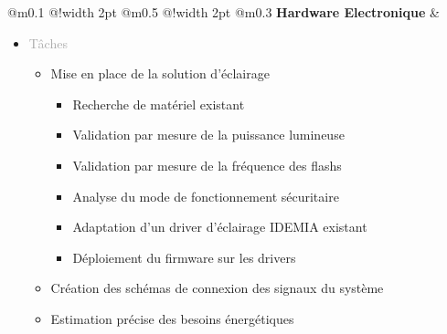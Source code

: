 \documentclass{article}
\begin{document}
\begin{tabular}
    {
        @{}m{}
        @{\hspace{0.001\textwidth}}!{\color{secondaryBlue}\vline width 2pt}
        @{}m{0.5\textwidth}
        @{\hspace{0.025\textwidth}}!{\color{secondaryBlue}\vline width 2pt}
        @{}m{0.3\textwidth}
    }
    \textcolor{secondaryBlue}{\textbf{Hardware Electronique}}           
    &
    \begin{itemize}[label={}, topsep=8pt, partopsep=0pt, itemsep=0.5pt, parsep=2pt, after=\vspace*{-\baselineskip}]
        \setlength{\itemsep}{10pt} 
        \item \textcolor{darkGray}{Tâches}
        \begin{itemize}[label={\textcolor{gray!100}{$\checkmark$}}, topsep=8pt, partopsep=0pt, itemsep=0.5pt, parsep=2pt] 
            \item \textcolor{gray!100}{Mise en place de la solution d'éclairage}
            \begin{itemize}[label={\textcolor{gray!100}{$\triangleright$}}, topsep=0pt, partopsep=0pt, itemsep=0.5pt, parsep=2pt] 
                \item \textcolor{gray!100}{Recherche de matériel existant}
                \item \textcolor{gray!100}{Validation par mesure de la puissance lumineuse}
                \item \textcolor{gray!100}{Validation par mesure de la fréquence des flashs}
                \item \textcolor{gray!100}{Analyse du mode de fonctionnement sécuritaire}
                \item \textcolor{gray!100}{Adaptation d'un driver d'éclairage IDEMIA existant}
                \item \textcolor{gray!100}{Déploiement du firmware sur les drivers}
            \end{itemize}
            \item \textcolor{gray!100}{Création des schémas de connexion des signaux du système}
            \item \textcolor{gray!100}{Estimation précise des besoins énergétiques}
            

\end{itemize}
\end{itemize}
\end{tabular}
\end{document}
